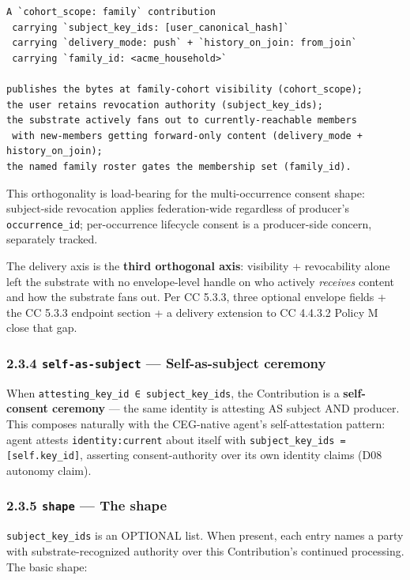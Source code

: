 \documentclass[11pt]{article}
\begin{document}
\begin{lstlisting}
A `cohort_scope: family` contribution
 carrying `subject_key_ids: [user_canonical_hash]`
 carrying `delivery_mode: push` + `history_on_join: from_join`
 carrying `family_id: <acme_household>`

publishes the bytes at family-cohort visibility (cohort_scope);
the user retains revocation authority (subject_key_ids);
the substrate actively fans out to currently-reachable members
 with new-members getting forward-only content (delivery_mode + history_on_join);
the named family roster gates the membership set (family_id).
\end{lstlisting}

This orthogonality is load-bearing for the multi-occurrence consent shape: subject-side revocation applies federation-wide regardless of producer's \texttt{occurrence\_id}; per-occurrence lifecycle consent is a producer-side concern, separately tracked.


The delivery axis is the \textbf{third orthogonal axis}: visibility + revocability alone left the substrate with no envelope-level handle on who actively \textit{receives} content and how the substrate fans out. Per CC 5.3.3, three optional envelope fields + the CC 5.3.3 endpoint section + a delivery extension to CC 4.4.3.2 Policy M close that gap.


\subsubsection*{2.3.4 \texttt{self-as-subject} — Self-as-subject ceremony}


When \texttt{attesting\_key\_id ∈ subject\_key\_ids}, the Contribution is a \textbf{self-consent ceremony} — the same identity is attesting AS subject AND producer. This composes naturally with the CEG-native agent's self-attestation pattern: agent attests \texttt{identity:current} about itself with \texttt{subject\_key\_ids = [self.key\_id]}, asserting consent-authority over its own identity claims (D08 autonomy claim).


\subsubsection*{2.3.5 \texttt{shape} — The shape}


\texttt{subject\_key\_ids} is an OPTIONAL list. When present, each entry names a party with substrate-recognized authority over this Contribution's continued processing. The basic shape:
\end{document}
